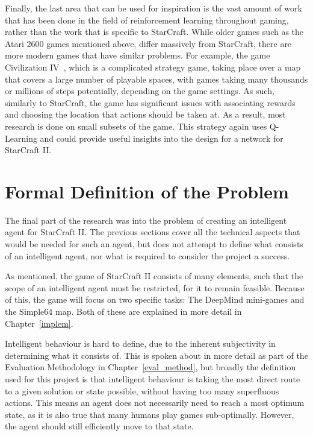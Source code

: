 Finally, the last area that can be used for inspiration is the vast amount of
work that has been done in the field of reinforcement learning throughout gaming,
rather than the work that is specific to StarCraft. While older games such as
the Atari 2600 games mentioned above, differ massively from StarCraft, there are
more modern games that have similar problems. For example, the game
Civilization IV~\cite{wender2008using}, which is a complicated strategy game,
taking place over a map that covers a large number of playable spaces, with
games taking many thousands or millions of steps potentially, depending on the
game settings. As such, similarly to StarCraft, the game has significant issues
with associating rewards and choosing the location that actions should be taken
at. As a result, most research is done on small subsets of the game. This
strategy again uses Q-Learning and could provide useful insights into the
design for a network for StarCraft II\@.

\section{Formal Definition of the Problem}

The final part of the research was into the problem of creating an intelligent
agent for StarCraft II\@. The previous sections cover all the technical aspects
that would be needed for such an agent, but does not attempt to define what
consists of an intelligent agent, nor what is required to consider the project a
success.

As mentioned, the game of StarCraft II consists of many elements, such that the
scope of an intelligent agent must be restricted, for it to remain feasible.
Because of this, the game will focus on two specific tasks: The DeepMind
mini-games and the Simple64 map. Both of these are explained in more detail in
Chapter~\ref{implem}.

Intelligent behaviour is hard to define, due to the inherent subjectivity in
determining what it consists of. This is spoken about in more detail as part of the
Evaluation Methodology in Chapter~\ref{eval_method}, but broadly the definition
used for this project is that intelligent behaviour is taking the most direct
route to a given solution or state possible, without having too many superfluous
actions. This means an agent does not necessarily need to reach a most optimum
state, as it is also true that many humans play games sub-optimally. However,
the agent should still efficiently move to that state.

